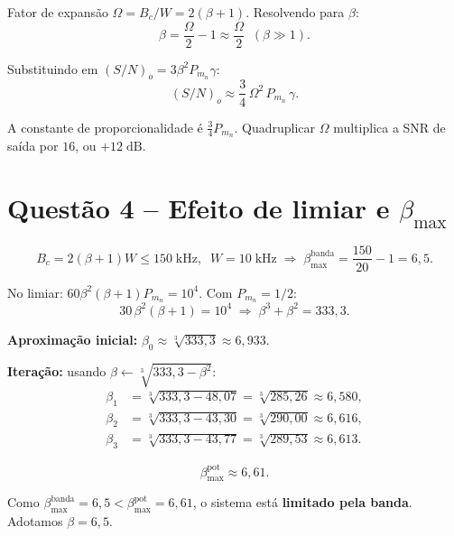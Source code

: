 \documentclass[11pt,a4paper]{article}
\begin{document}
\begin{resolucao}

Fator de expansão $\Omega = B_c/W = 2(\beta+1)$. Resolvendo para $\beta$:
\[
  \beta = \frac{\Omega}{2} - 1 \approx \frac{\Omega}{2} \;\;(\beta \gg 1).
\]

Substituindo em $(S/N)_o = 3\beta^2 P_{m_n}\gamma$:
\[
  \boxed{(S/N)_o \approx \frac{3}{4}\,\Omega^2\,P_{m_n}\,\gamma.}
\]

A constante de proporcionalidade é $\tfrac{3}{4}P_{m_n}$. Quadruplicar $\Omega$ multiplica a SNR de saída por $16$, ou $+12\;\text{dB}$.
\end{resolucao}

\section*{Questão 4 -- Efeito de limiar e $\beta_{\max}$}

\begin{resolucao}

\[
  B_c = 2(\beta + 1) W \le 150\;\text{kHz}, \;\; W = 10\;\text{kHz}
  \;\Rightarrow\; \boxed{\beta_{\max}^{\text{banda}} = \frac{150}{20} - 1 = 6{,}5.}
\]
\end{resolucao}

\begin{resolucao}

No limiar: $60\beta^2(\beta+1)P_{m_n} = 10^4$. Com $P_{m_n} = 1/2$:
\[
  30\,\beta^2(\beta+1) = 10^4 \;\Rightarrow\; \beta^3 + \beta^2 = 333{,}3.
\]

\textbf{Aproximação inicial:} $\beta_0 \approx \sqrt[3]{333{,}3} \approx 6{,}933$.

\textbf{Iteração:} usando $\beta \leftarrow \sqrt[3]{333{,}3 - \beta^2}$:
\begin{align*}
  \beta_1 &= \sqrt[3]{333{,}3 - 48{,}07} = \sqrt[3]{285{,}26} \approx 6{,}580, \\
  \beta_2 &= \sqrt[3]{333{,}3 - 43{,}30} = \sqrt[3]{290{,}00} \approx 6{,}616, \\
  \beta_3 &= \sqrt[3]{333{,}3 - 43{,}77} = \sqrt[3]{289{,}53} \approx 6{,}613.
\end{align*}

\[
  \boxed{\beta_{\max}^{\text{pot}} \approx 6{,}61.}
\]

Como $\beta_{\max}^{\text{banda}} = 6{,}5 < \beta_{\max}^{\text{pot}} = 6{,}61$, o sistema está \textbf{limitado pela banda}. Adotamos $\beta = 6{,}5$.
\end{resolucao}
\end{document}
